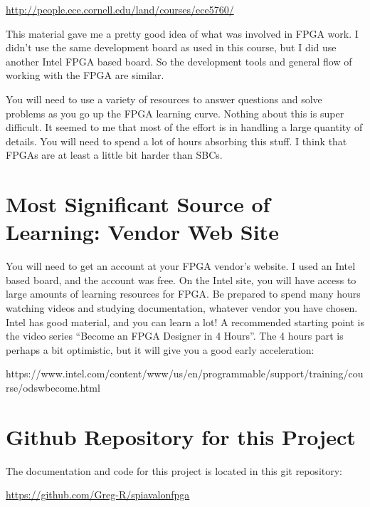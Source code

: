 \url{http://people.ece.cornell.edu/land/courses/ece5760/}

This material gave me a pretty good idea of what was involved in FPGA work.
I didn't use the same development board as used in this course, but I did use
another Intel FPGA based board.  So the development tools and general flow of working
with the FPGA are similar.

You will need to use a variety of resources to answer questions and solve problems as you go up the FPGA learning curve.
Nothing about this is super difficult.  It seemed to me that most of the effort is in handling a large quantity of details.
You will need to spend a lot of hours absorbing this stuff.  I think that FPGAs are at least a little bit harder than SBCs.

\section{Most Significant Source of Learning: Vendor Web Site}

You will need to get an account at your FPGA vendor's website.  I used an Intel based board, and the account was free.
On the Intel site, you will have access to large amounts of learning resources for FPGA.
Be prepared to spend many hours watching videos and studying documentation, whatever vendor you have chosen.
Intel has good material, and you can learn a lot!  A recommended starting point is the video series ``Become an FPGA Designer in 4 Hours''.
The 4 hours part is perhaps a bit optimistic, but it will give you a good early acceleration:

https://www.intel.com/content/www/us/en/programmable/support/training/course/odswbecome.html



\section{Github Repository for this Project}

The documentation and code for this project is located in this git repository:

\url{https://github.com/Greg-R/spiavalonfpga}